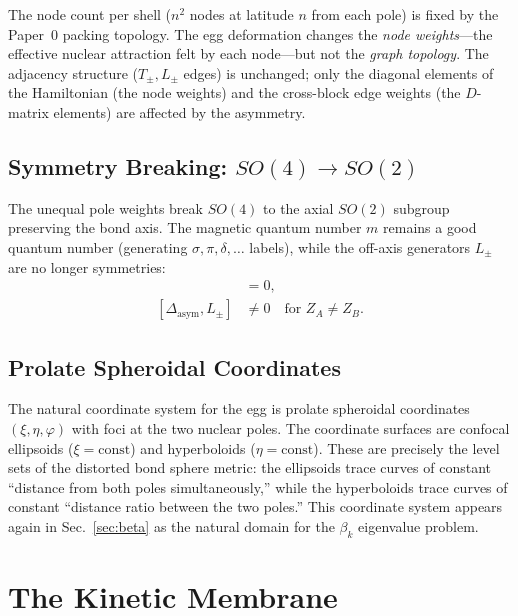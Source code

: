 \documentclass[aps,pra,twocolumn,superscriptaddress,longbibliography]{revtex4-2}
\begin{document}
The node count per shell ($n^2$ nodes at latitude $n$ from each pole)
is fixed by the Paper~0 packing topology.  The egg deformation changes
the \emph{node weights}---the effective nuclear attraction felt by each
node---but not the \emph{graph topology}.  The adjacency structure
($T_\pm, L_\pm$ edges) is unchanged; only the diagonal elements of the
Hamiltonian (the node weights) and the cross-block edge weights (the
$D$-matrix elements) are affected by the asymmetry.

\subsection{Symmetry Breaking: $SO(4) \to SO(2)$}

The unequal pole weights break $SO(4)$ to the axial $SO(2)$ subgroup
preserving the bond axis.  The magnetic quantum number $m$ remains a
good quantum number (generating $\sigma, \pi, \delta, \ldots$ labels),
while the off-axis generators $L_\pm$ are no longer symmetries:
\begin{align}
[\Delta_{\text{asym}}, L_z] &= 0, \label{eq:Lz_comm} \\
[\Delta_{\text{asym}}, L_\pm] &\neq 0 \quad\text{for } Z_A \neq Z_B.
\label{eq:Lpm_comm}
\end{align}

\subsection{Prolate Spheroidal Coordinates}

The natural coordinate system for the egg is prolate spheroidal
coordinates $(\xi, \eta, \varphi)$ with foci at the two nuclear poles.
The coordinate surfaces are confocal ellipsoids ($\xi = \text{const}$)
and hyperboloids ($\eta = \text{const}$).  These are precisely the
level sets of the distorted bond sphere metric: the ellipsoids trace
curves of constant ``distance from both poles simultaneously,'' while
the hyperboloids trace curves of constant ``distance ratio between
the two poles.''  This coordinate system appears again in
Sec.~\ref{sec:beta} as the natural domain for the $\beta_k$ eigenvalue
problem.


\section{The Kinetic Membrane}
\label{sec:membrane}
\end{document}
